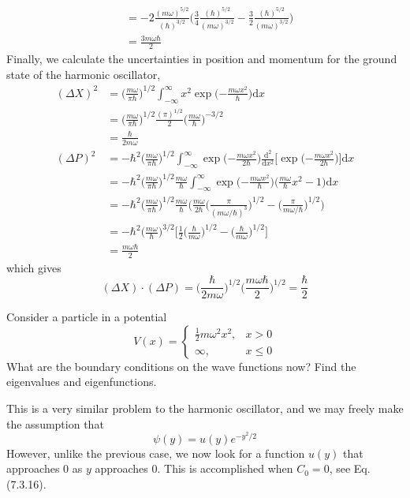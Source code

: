 \documentclass[../principles-of-quantum-mechanics.tex]{subfiles}
\begin{document}
\begin{questions}
\begin{solution}
\begin{align*}
				&= -2\frac{(m\omega)^{5/2}}{(\hbar)^{3/2}}\Big(\frac{3}{4}\frac{(\hbar)^{5/2}}{(m\omega)^{3/2}} - \frac{3}{2}\frac{(\hbar)^{5/2}}{(m\omega)^{3/2}}\Big) \\
				&= \frac{3m\omega\hbar}{2}
			\end{align*}
			Finally, we calculate the uncertainties in position and momentum for the ground state of the harmonic oscillator,
			\begin{align*}
				(\Delta X)^2 &= \Big(\frac{m\omega}{\pi\hbar}\Big)^{1/2}\int_{-\infty}^{\infty}x^2\exp\Big({-\frac{m\omega x^2}{\hbar}}\Big)\mathrm{d}x \\
				&= \Big(\frac{m\omega}{\pi\hbar}\Big)^{1/2}\frac{(\pi)^{1/2}}{2}\Big(\frac{m\omega}{\hbar}\Big)^{-3/2} \\
				&= \frac{\hbar}{2m\omega} \\
				(\Delta P)^2 &= -\hbar^2\Big(\frac{m\omega}{\pi\hbar}\Big)^{1/2}\int_{-\infty}^{\infty}\exp\Big({-\frac{m\omega x^2}{2\hbar}}\Big)\frac{\mathrm{d}^2}{\mathrm{d}x^2}\Big[\exp\Big({-\frac{m\omega x^2}{2\hbar}}\Big)\Big]\mathrm{d}x \\
				&= -\hbar^2\Big(\frac{m\omega}{\pi\hbar}\Big)^{1/2}\frac{m\omega}{\hbar}\int_{-\infty}^{\infty}\exp\Big({-\frac{m\omega x^2}{\hbar}}\Big)\Big(\frac{m\omega}{\hbar}x^2 - 1\Big)\mathrm{d}x \\
				&= -\hbar^2\Big(\frac{m\omega}{\pi\hbar}\Big)^{1/2}\frac{m\omega}{\hbar}\Big(\frac{m\omega}{2\hbar}\Big(\frac{\pi}{(m\omega/\hbar)^3}\Big)^{1/2} - \Big(\frac{\pi}{m\omega/\hbar}\Big)^{1/2}\Big) \\
				&= -\hbar^2\Big(\frac{m\omega}{\hbar}\Big)^{3/2}\Big[\frac{1}{2}\Big(\frac{\hbar}{m\omega}\Big)^{1/2} - \Big(\frac{\hbar}{m\omega}\Big)^{1/2}\Big] \\
				&= \frac{m\omega\hbar}{2}
			\end{align*}
			which gives
			$$(\Delta X)\cdot(\Delta P) = \Big(\frac{\hbar}{2m\omega}\Big)^{1/2}\Big(\frac{m\omega\hbar}{2}\Big)^{1/2} = \frac{\hbar}{2}$$
		\end{solution}
		
		\question Consider a particle in a potential
		$$V(x) = \begin{cases}
			\frac{1}{2}m\omega^2x^2, &x > 0\\
			\infty, &x \leq 0
		\end{cases}$$
		What are the boundary conditions on the wave functions now? Find the eigenvalues and eigenfunctions.
		
		\begin{solution}
			This is a very similar problem to the harmonic oscillator, and we may freely make the assumption that
			$$\psi(y) = u(y)e^{-y^2/2}$$
			However, unlike the previous case, we now look for a function $u(y)$ that approaches $0$ as $y$ approaches $0$. This is accomplished when $C_0 = 0$, see Eq. (7.3.16).
			

\end{solution}
\end{questions}
\end{document}
